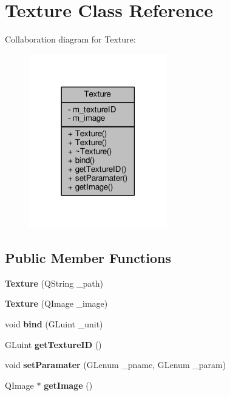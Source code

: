 \hypertarget{class_texture}{\section{Texture Class Reference}
\label{class_texture}
}


Collaboration diagram for Texture\-:
\nopagebreak
\begin{figure}[H]
\begin{center}
\leavevmode
\includegraphics[width=170pt]{class_texture__coll__graph}
\end{center}
\end{figure}
\subsection*{Public Member Functions}
\begin{DoxyCompactItemize}
\item 
\hypertarget{class_texture_ac06402863be2cfa525e3f8f9c3a9e252}{{\bfseries Texture} (Q\-String \-\_\-path)}\label{class_texture_ac06402863be2cfa525e3f8f9c3a9e252}

\item 
\hypertarget{class_texture_a12a4dda2e8701b811472b8a37388a6e8}{{\bfseries Texture} (Q\-Image \-\_\-image)}\label{class_texture_a12a4dda2e8701b811472b8a37388a6e8}

\item 
\hypertarget{class_texture_aaa3d6a6286ba08e6ddd271becbc7ef49}{void {\bfseries bind} (G\-Luint \-\_\-unit)}\label{class_texture_aaa3d6a6286ba08e6ddd271becbc7ef49}

\item 
\hypertarget{class_texture_a2329d37c89bb29a6bd244ac66b6bc408}{G\-Luint {\bfseries get\-Texture\-I\-D} ()}\label{class_texture_a2329d37c89bb29a6bd244ac66b6bc408}

\item 
\hypertarget{class_texture_ad3b169e8b4f41c1e397a599821e4ded8}{void {\bfseries set\-Paramater} (G\-Lenum \-\_\-pname, G\-Lenum \-\_\-param)}\label{class_texture_ad3b169e8b4f41c1e397a599821e4ded8}

\item 
\hypertarget{class_texture_a6e658a96996016ead8bda2a42bfe47d4}{Q\-Image $\ast$ {\bfseries get\-Image} ()}\label{class_texture_a6e658a96996016ead8bda2a42bfe47d4}

\end{DoxyCompactItemize}
